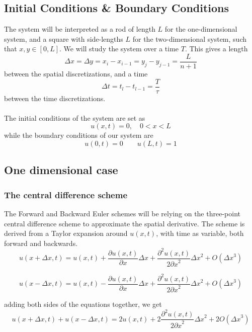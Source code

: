 \documentclass[10pt,a4paper]{article}
\newcommand{\dt}{{\Delta t}}
\newcommand{\dx}{{\Delta x}}
\newcommand{\dy}{{\Delta y}}
\newcommand{\px}{{\partial x}}
\newcommand{\pu}{{\partial u}}
\newcommand{\ppu}{{\partial^2 u}}
\begin{document}
\subsection{Initial Conditions \& Boundary Conditions}
The system will be interpreted as a rod of length $L$ for the one-dimensional system, and a square with side-lengths $L$ for the two-dimensional system, such that $x,y \in [0,L]$. We will study the system over a time $T$. This gives a length
\begin{equation}
\dx = \dy = x_i - x_{i-1} = y_j - y_{j-1} = \frac{L}{n+1}
\end{equation}
between the spatial discretizations, and a time
\begin{equation}
\dt = t_l - t_{l-1} = \frac{T}{\tau}
\end{equation}
between the time discretizations.\\\\
The initial conditions of the system are set as
\begin{equation}
u(x,t) = 0, \quad 0 < x < L
\end{equation}
while the boundary conditions of our system are
\begin{equation}
u(0,t) = 0 \quad \quad u(L,t) = 1
\end{equation}




\subsection{One dimensional case}\label{sec:method:1d}
\subsubsection{The central difference scheme}\label{sec:cent}
The Forward and Backward Euler schemes will be relying on the three-point central difference scheme to approximate the spatial derivative. The scheme is derived from a Taylor expansion around $u(x,t)$, with time as variable, both forward and backwards.
\begin{equation}
u(x+\Delta x, t) = u(x,t) + \frac{\pu(x,t)}{\px}\dx + \frac{\ppu(x,t)}{2\px^2}\dx^2 + O(\dx^3)
\end{equation}

\begin{equation}
u(x-\Delta x, t) = u(x,t) - \frac{\pu(x,t)}{\px}\dx + \frac{\ppu(x,t)}{2\px^2}\dx^2 + O(\dx^3)
\end{equation}

adding both sides of the equations together, we get
\begin{equation}
u(x+\Delta x, t) + u(x-\Delta x, t) = 2u(x,t) + 2\frac{\ppu(x,t)}{2\px^2}\dx^2 + 2O(\dx^3)
\end{equation}
\end{document}

